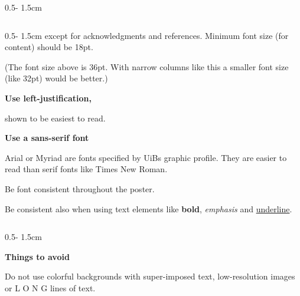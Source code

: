 \documentclass{uibposter}
\begin{document}
\begin{frame}
\begin{columns}
\begin{column}{0.5\textwidth - 1.5cm}
\begin{column}{0.5\textwidth - 1.5cm}
    except for acknowledgments and references. Minimum font size (for content) should be 18pt.

    (The font size above is 36pt. With narrow columns like this a smaller font size (like 32pt) would be better.)
\vspace{0.5cm}

    \textbf{Use left-justification,}
    \vspace{0.2cm}

    shown to be easiest to read.
\vspace{0.5cm}

    \textbf{Use a sans-serif font}
    \vspace{0.2cm}

    Arial or Myriad are fonts specified by UiBs graphic profile. They are easier to read than serif fonts like Times New Roman.
\vspace{0.2cm}

    Be font consistent throughout the poster.
\vspace{0.2cm}

    Be consistent also when using text elements like \textbf{bold}, \textit{emphasis} and \underline{underline}.
\end{column}
\begin{column}{0.5\textwidth - 1.5cm}
\vspace*{-25.5cm}

    \textbf{Things to avoid}
\vspace{0.5cm}

    Do not use colorful backgrounds with super-imposed text, low-resolution images or L O N G lines of text.
        \vspace{1.5cm}

    \vspace{1.5cm}


\end{column}
\end{column}
\end{columns}
\end{frame}
\end{document}
